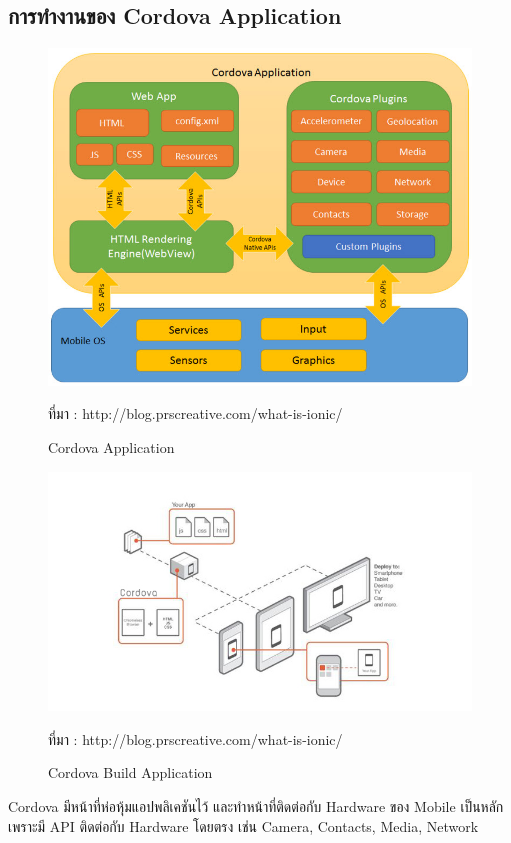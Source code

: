 		\subsection{การทำงานของ Cordova Application}
		\begin{figure}[H]
			\centering
			\includegraphics[width=0.8\columnwidth]{Figures/2/ionic2}
			\caption{Cordova Application}{ที่มา : http://blog.prscreative.com/what-is-ionic/}
			\label{Fig:lifecycle}
		\end{figure}
		\begin{figure}[H]
			\centering
			\includegraphics[width=0.8\columnwidth]{Figures/2/ionic3}
			\caption{Cordova Build Application}{ที่มา : http://blog.prscreative.com/what-is-ionic/}
			\label{Fig:lifecycle}
		\end{figure}

		\item Cordova มีหน้าที่ห่อหุ้มแอปพลิเคชันไว้ และทำหน้าที่ติดต่อกับ Hardware ของ Mobile เป็นหลักเพราะมี API ติดต่อกับ Hardware โดยตรง เช่น Camera, Contacts, Media, Network
		
